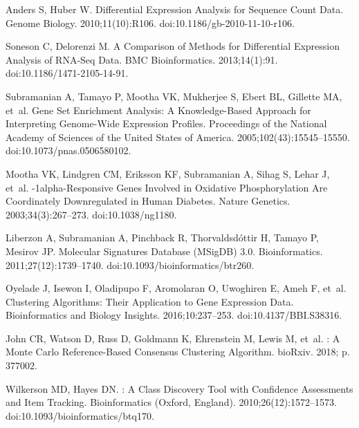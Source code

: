 \documentclass[10pt,letterpaper]{article}
\begin{document}
\begin{thebibliography}{10}
	Anders S, Huber W.
	\newblock Differential Expression Analysis for Sequence Count Data.
	\newblock Genome Biology. 2010;11(10):R106.
	\newblock doi:{10.1186/gb-2010-11-10-r106}.

	Soneson C, Delorenzi M.
	\newblock A Comparison of Methods for Differential Expression Analysis of
	{{RNA}}-Seq Data.
	\newblock BMC Bioinformatics. 2013;14(1):91.
	\newblock doi:{10.1186/1471-2105-14-91}.

	Subramanian A, Tamayo P, Mootha VK, Mukherjee S, Ebert BL, Gillette MA, et~al.
	\newblock Gene Set Enrichment Analysis: A Knowledge-Based Approach for
	Interpreting Genome-Wide Expression Profiles.
	\newblock Proceedings of the National Academy of Sciences of the United States
	of America. 2005;102(43):15545--15550.
	\newblock doi:{10.1073/pnas.0506580102}.

	Mootha VK, Lindgren CM, Eriksson KF, Subramanian A, Sihag S, Lehar J, et~al.
	-1alpha-Responsive Genes Involved in Oxidative Phosphorylation
	Are Coordinately Downregulated in Human Diabetes.
	\newblock Nature Genetics. 2003;34(3):267--273.
	\newblock doi:{10.1038/ng1180}.

	Liberzon A, Subramanian A, Pinchback R, Thorvaldsd{\'o}ttir H, Tamayo P,
	Mesirov JP.
	\newblock Molecular Signatures Database ({{MSigDB}}) 3.0.
	\newblock Bioinformatics. 2011;27(12):1739--1740.
	\newblock doi:{10.1093/bioinformatics/btr260}.

	Oyelade J, Isewon I, Oladipupo F, Aromolaran O, Uwoghiren E, Ameh F, et~al.
	\newblock Clustering {{Algorithms}}: {{Their Application}} to {{Gene Expression
			Data}}.
	\newblock Bioinformatics and Biology Insights. 2016;10:237--253.
	\newblock doi:{10.4137/BBI.S38316}.

	John CR, Watson D, Russ D, Goldmann K, Ehrenstein M, Lewis M, et~al.
	: {{A Monte Carlo}} Reference-Based Consensus Clustering
	Algorithm.
	\newblock bioRxiv. 2018; p. 377002.

	Wilkerson MD, Hayes DN.
	: A Class Discovery Tool with Confidence
	Assessments and Item Tracking.
	\newblock Bioinformatics (Oxford, England). 2010;26(12):1572--1573.
	\newblock doi:{10.1093/bioinformatics/btq170}.


\end{thebibliography}
\end{document}
